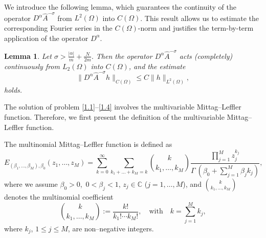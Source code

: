 \documentclass[12pt, reqno]{amsart}
\newtheorem{lemma}[theorem]{Lemma}
\theoremstyle{definition}
\theoremstyle{remark}
\numberwithin{equation}{section}
\begin{document}
We introduce the following lemma, which guarantees the continuity of the operator 
$D^{\alpha}\widehat{A}^{-\sigma}$ from $L^{2}(\Omega)$ into $C(\Omega)$. 
This result allows us to estimate the corresponding Fourier series in the 
$C(\Omega)$-norm and justifies the term-by-term application of the operator 
$D^{\alpha}$.

\begin{lemma}\label{lem1} \cite{20}
Let
$
\sigma > \frac{|\alpha|}{m} + \frac{N}{2m}.
$
Then the operator $D^{\alpha}\widehat{A}^{-\sigma}$ acts (completely) continuously
from $L_{2}(\Omega)$ into $C(\Omega)$, and the estimate
\[
\| D^{\alpha}\widehat{A}^{-\sigma} h \|_{C(\Omega)}
\le
C \| h \|_{L^{2}(\Omega)},
\]
holds.
\end{lemma}

The solution of problem \eqref{1.1}–\eqref{1.4} involves the multivariable Mittag--Leffler function. Therefore, we first present the definition of the multivariable Mittag--Leffler function.


The multinomial Mittag--Leffler function is defined as \cite{21}
$$E_{(\beta_1,\dots,\beta_M),\beta_0}(z_1,\dots,z_M)
=
\sum_{k=0}^\infty
\sum_{k_1+\dots+k_M=k}
\binom{k}{k_1,\dots,k_M}
\frac{\prod_{j=1}^M z_j^{k_j}}{\Gamma\ \left(\beta_0+\sum_{j=1}^M \beta_j k_j\right)},$$
where we assume \(\beta_0 > 0\),\, \(0 < \beta_j < 1\), \(z_j \in \mathbb{C}\) (\(j = 1, \dots, M\)), and \(\binom{k}{k_1,\dots,k_M}\) denotes
the multinomial coefficient
\[
\binom{k}{k_1,\dots,k_M} := \frac{k!}{k_1! \cdots k_M!},\quad
\text{with} \quad
k = \sum_{j=1}^{M} k_j,
\]
where \(k_j\), \(1 \le j \le M\), are non--negative integers.
\end{document}
